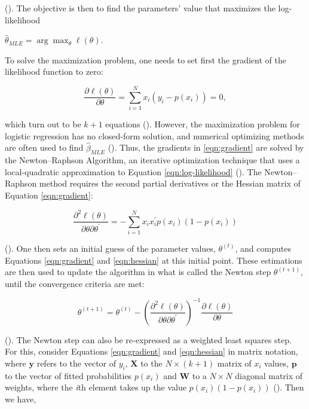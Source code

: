 (\cite{montesinos2022multivariate}). The objective is then to find the parameters' value that maximizes the log-likelihood 

\begin{center}
    $\widehat{\theta}_{MLE} = \arg \max_\theta \ell(\theta)$.
\end{center}

To solve the maximization problem, one needs to set first the gradient of the likelihood function to zero:

\begin{equation}
    \frac{\partial \ell(\theta)}{\partial \theta} = \sum_{i=1}^{N} x_i(y_i-p(x_i))=0,
    \label{eqn:gradient}
\end{equation}

which turn out to be $k + 1$ equations (\cite{hastie2009elements}). However, the maximization problem for logistic regression has no closed-form solution, and numerical optimizing methods are often used to find $\widehat{\beta}_{MLE}$ (\cite{cheng2020}). Thus, the gradients in \ref{eqn:gradient} are solved by the Newton–Raphson Algorithm, an iterative optimization technique that uses a local-quadratic approximation to Equation \ref{eqn:log-likelihood} (\cite{montesinos2022multivariate}). The Newton–Raphson method requires the second partial derivatives or the Hessian matrix of Equation \ref{eqn:gradient}:

\begin{equation}
    \frac{\partial^2 \ell(\theta)}{\partial \theta \partial \theta^\prime}=-\sum_{i=1}^N x_i x_i^\prime p\left(x_i \right)\left(1-p\left(x_i\right)\right)
    \label{eqn:hessian}
\end{equation}

(\cite{hastie2009elements}). One then sets an initial guess of the parameter values, $\theta^{(t)}$, and computes Equations \ref{eqn:gradient} and \ref{eqn:hessian} at this initial point. These estimations are then used to update the algorithm in what is called the Newton step $\theta^{(t+1)}$, until the convergence criteria are met:

\begin{equation}
    \theta^{(t+1)} = \theta^{(t)} - \left( \frac{\partial^2 \ell(\theta)}{\partial \theta \partial \theta^\prime} \right)^{-1} \frac{\partial \ell(\theta)}{\partial \theta}
    \label{eqn:newton-step}
\end{equation}

(\cite{hastie2009elements}). The Newton step can also be re-expressed as a weighted least squares step. For this, consider Equations \ref{eqn:gradient} and \ref{eqn:hessian} in matrix notation, where $\textbf{y}$ refers to the vector of $y_i$, $\textbf{X}$ to the $N \times (k+1)$ matrix of $x_i$ values, $\textbf{p}$ to the vector of fitted probabilities $p(x_i)$ and $\textbf{W}$ to a $N \times N$ diagonal matrix of weights, where the \textit{i}th element takes up the value $p(x_i)(1-p(x_i))$ (\cite{hastie2009elements}). Then we have,

